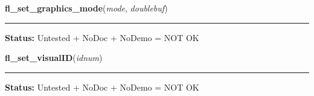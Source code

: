     \label{xformslib:library:fl_set_graphics_mode}

    \vspace{0.5ex}

\hspace{.8\funcindent}\begin{boxedminipage}{\funcwidth}

    \raggedright \textbf{fl\_set\_graphics\_mode}(\textit{mode}, \textit{doublebuf})

    \vspace{-1.5ex}

    \rule{\textwidth}{0.5\fboxrule}
\setlength{\parskip}{2ex}
\setlength{\parskip}{1ex}
\textbf{Status:} Untested + NoDoc + NoDemo = NOT OK



    \end{boxedminipage}

    \label{xformslib:library:fl_set_visualID}

    \vspace{0.5ex}

\hspace{.8\funcindent}\begin{boxedminipage}{\funcwidth}

    \raggedright \textbf{fl\_set\_visualID}(\textit{idnum})

    \vspace{-1.5ex}

    \rule{\textwidth}{0.5\fboxrule}
\setlength{\parskip}{2ex}
\setlength{\parskip}{1ex}
\textbf{Status:} Untested + NoDoc + NoDemo = NOT OK



    \end{boxedminipage}

    \label{xformslib:library:fl_keysym_pressed}

    \vspace{0.5ex}

